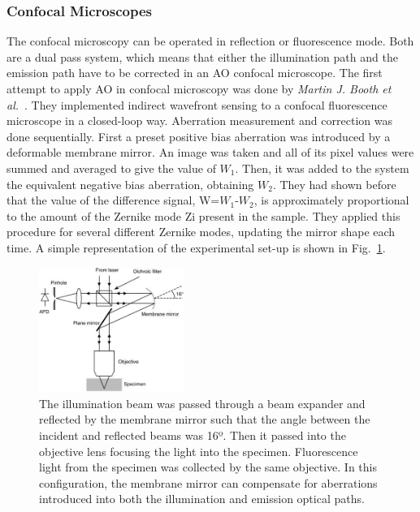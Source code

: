 \subsubsection{Confocal Microscopes}
\label{sec:ConfocalMicroscopes}

The confocal microscopy can be operated in reflection or fluorescence mode. Both are a dual pass system, which means that either the illumination path and the emission path have to be corrected in an AO confocal microscope. The first attempt to apply AO in confocal microscopy was done by \textit{Martin J. Booth et al.}~\cite{scan_CFM}. They implemented indirect wavefront sensing to a confocal fluorescence microscope in a closed-loop way. Aberration measurement and correction was done sequentially. First a preset positive bias aberration was introduced by a deformable membrane mirror. An image was taken and all of its pixel values were summed and averaged to give the value of $W_1$. Then, it was added to the system the equivalent negative bias aberration, obtaining $W_2$. They had shown before that the value of the difference signal, W=$W_1$-$W_2$, is approximately proportional to the amount of the Zernike mode Zi present in the sample. They applied this procedure for several different Zernike modes, updating the mirror shape each time. A simple representation of the experimental set-up is shown in Fig.~\ref{fig:AOM_scan_CFM}.

\begin{figure}[htbp]
	\centering
		\includegraphics[width=0.42\textwidth,height=0.22\textheight]{images/AOM_scan_CFM.jpg}
		\caption{The illumination beam was passed through a beam expander and reflected by the membrane mirror such that the angle between the incident and reflected beams was 16º. Then it passed into the objective lens focusing the light into the specimen. Fluorescence light from the specimen was collected by the same objective. In this configuration, the membrane mirror can compensate for aberrations introduced into both the illumination and emission optical paths.}
	\label{fig:AOM_scan_CFM}
\end{figure}
  
